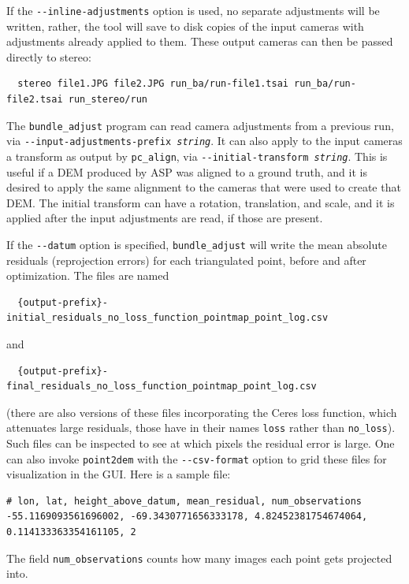 If the \texttt{-\/-inline-adjustments} option is used, no separate
adjustments will be written, rather, the tool will save to disk copies
of the input cameras with adjustments already applied to them. These
output cameras can then be passed directly to stereo:
\begin{verbatim}
  stereo file1.JPG file2.JPG run_ba/run-file1.tsai run_ba/run-file2.tsai run_stereo/run
\end{verbatim} 

The \texttt{bundle\_adjust} program can read camera adjustments from a
previous run, via \texttt{-\/-input-adjustments-prefix
\textit{string}}. It can also apply to the input cameras a transform as
output by \texttt{pc\_align}, via \texttt{-\/-initial-transform
\textit{string}}.  This is useful if a DEM produced by ASP was aligned
to a ground truth, and it is desired to apply the same alignment to the
cameras that were used to create that DEM. The initial transform can have
a rotation, translation, and scale, and it is applied after the input
adjustments are read, if those are present. 

If the \texttt{-\/-datum} option is specified, \texttt{bundle\_adjust}
will write the mean absolute residuals (reprojection errors) for each
triangulated point, before and after optimization. The files are named
\begin{verbatim}
  {output-prefix}-initial_residuals_no_loss_function_pointmap_point_log.csv
\end{verbatim}
and
\begin{verbatim}
  {output-prefix}-final_residuals_no_loss_function_pointmap_point_log.csv
\end{verbatim}
(there are also versions of these files incorporating the Ceres loss function,
which attenuates large residuals, those have in their names \texttt{loss}
rather than \texttt{no\_loss}). Such files can be inspected to see at which pixels
the residual error is large. One can also invoke \texttt{point2dem} with the 
\texttt{-\/-csv-format} option to grid these files for visualization in the GUI.
Here is a sample file:

\begin{verbatim}
# lon, lat, height_above_datum, mean_residual, num_observations
-55.1169093561696002, -69.3430771656333178, 4.82452381754674064, 0.114133363354161105, 2
\end{verbatim}

The field \texttt{num\_observations} counts how many images each point
gets projected into.


